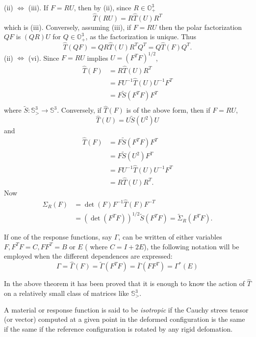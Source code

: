 (ii) $\Leftrightarrow$ (iii). If $F= RU$, then by (ii),
since $R \in \mathbb{O}^3_+$
$$
\hat{T}(RU)= R \hat{T}(U)R^T
$$
which is (iii). Conversely, assuming (iii), if $F=RU$ then the
polar factorization $QF$ is $(QR)U$ for $Q \in \mathbb{O}^3_+$, as the
factorization is unique. Thus 
$$
\hat{T}(QF)= QR \hat{T}(U) R^T Q^T = Q\hat{T}(F)Q^T. 
$$ 
(ii) $\Leftrightarrow$ (vi). Since $F=RU$ implies $U=(F^TF)^{1/2}$, 
\begin{align*}
  \hat{T}(F)&= R \hat{T}(U)R^T\\
  &= FU^{-1} \hat{T}(U)U^{-1} F^T\\
  &= F \tilde{S} (F^T F) F^T\\
\end{align*}
where $\tilde{S}: \mathbb{S}^3_> \to \mathbb{S}^3$. Conversely, if
$\hat{T}(F)$ is of the above form, then if $F=RU$,  
$$
\hat{T}(U)= U \tilde{S}(U^2)U
$$\pageoriginale
and 
 \begin{align*}
   \hat{T}(F)&= F \tilde{S}(F^T F) F^T\\
   &= F \tilde{S}(U^2) F^T\\
   &= F U^{-1}\hat{T}(U) U^{-1} F^T\\
   &= R \hat{T}(U) R^T. 
 \end{align*} 
 Now
 \begin{align*}
\Sigma_R (F) &= \det (F) F^{-1} \hat{T}(F) F^{-T}\\
&= (\det (F^TF))^{1/2} \tilde{S}(F^TF)= \tilde{\Sigma}_R (F^T F). 
 \end{align*} 

\begin{remark}\label{chap1-rem1.3.2} %
If one of the response functions, say $\Gamma$, can be written of
either variables $F, F^T F=C, FF^T =B$ or $E$ ( where $C=I+2E $), the
following notation will be employed when the different dependences are
expressed: 
$$
\Gamma = \hat{\Gamma}(F)= \tilde{\Gamma}(F^TF)= \bar{\Gamma}(FF^T)= \Gamma^*(E)
$$
\end{remark}

In the above theorem it has been proved that it is enough to know the
action of $\hat{T}$ on a relatively small class of matrices like
$\mathbb{S}^3_>$.

A material or response function is said to be
\textit{isotropic} if 
the Cauchy strees tensor (or vector) computed at a given point in the
deformed configuration is the same if the same if the reference
configuration is rotated by any rigid defomation.

